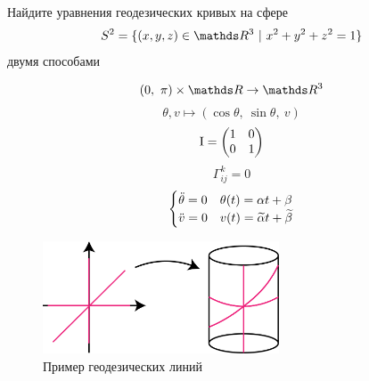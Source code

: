 \documentclass[main]{subfiles}
\begin{document}

    \begin{task}
        Найдите уравнения геодезических кривых на сфере
        \[S^2 = \{(x,y,z) \in \R^3 \ |\ x^2 + y^2 + z^2 = 1\}\]
        двумя способами
    \end{task}

    \begin{Remark}
        \[(0,\ \pi) \times \R \ra \R^3\]
        \[\theta, v \mapsto (\cos \theta,\ \sin \theta,\ v)\]
        \[\RNumb{1} = \begin{pmatrix}
            1 & 0\\
            0 & 1
        \end{pmatrix}\]
        \[\Gamma_{ij}^k = 0\]
        \[\begin{cases}
            \ddot{\theta} = 0 & \theta(t) = \alpha t + \beta\\
            \ddot{v} = 0 & v(t) = \widetilde{\alpha} t + \widetilde{\beta}
        \end{cases}\]
        \begin{figure}[H]
            \includegraphics[width=7cm]{pics/14_1}
            \centering
            \caption{Пример геодезических линий}
        \end{figure}
    \end{Remark}
\end{document}
